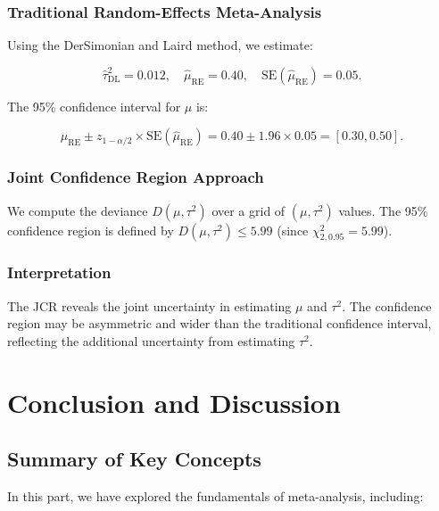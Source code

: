 \documentclass[12pt,a4paper]{report}
\begin{document}
\subsection{Traditional Random-Effects Meta-Analysis}
\label{subsec:traditional_meta_analysis}

Using the DerSimonian and Laird method, we estimate:

\[
\hat{\tau}^2_{\text{DL}} = 0.012, \quad \hat{\mu}_{\text{RE}} = 0.40, \quad \text{SE}(\hat{\mu}_{\text{RE}}) = 0.05.
\]

The 95\% confidence interval for $\mu$ is:

\[
\hat{\mu}_{\text{RE}} \pm z_{1 - \alpha/2} \times \text{SE}(\hat{\mu}_{\text{RE}}) = 0.40 \pm 1.96 \times 0.05 = [0.30, 0.50].
\]

\subsection{Joint Confidence Region Approach}
\label{subsec:jcr_application}

We compute the deviance $D(\mu, \tau^2)$ over a grid of $(\mu, \tau^2)$ values. The 95\% confidence region is defined by $D(\mu, \tau^2) \leq 5.99$ (since $\chi^2_{2, 0.95} = 5.99$).

\subsection{Interpretation}
\label{subsec:jcr_interpretation}

The JCR reveals the joint uncertainty in estimating $\mu$ and $\tau^2$. The confidence region may be asymmetric and wider than the traditional confidence interval, reflecting the additional uncertainty from estimating $\tau^2$.

\chapter{Conclusion and Discussion}
\label{chap:conclusion}

\section{Summary of Key Concepts}
\label{sec:summary_key_concepts}

In this part, we have explored the fundamentals of meta-analysis, including:
\end{document}
